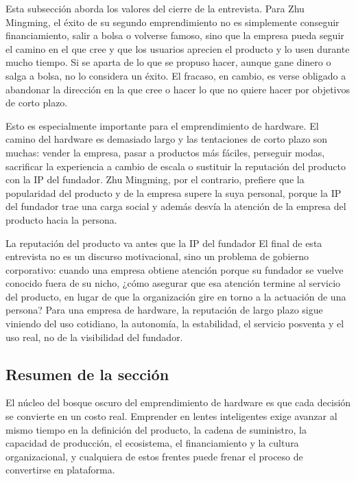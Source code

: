 \documentclass[a4paper]{article}
\begin{document}
Esta subsección aborda los valores del cierre de la entrevista. Para Zhu Mingming, el éxito de su segundo emprendimiento no es simplemente conseguir financiamiento, salir a bolsa o volverse famoso, sino que la empresa pueda seguir el camino en el que cree y que los usuarios aprecien el producto y lo usen durante mucho tiempo. Si se aparta de lo que se propuso hacer, aunque gane dinero o salga a bolsa, no lo considera un éxito. El fracaso, en cambio, es verse obligado a abandonar la dirección en la que cree o hacer lo que no quiere hacer por objetivos de corto plazo.

Esto es especialmente importante para el emprendimiento de hardware. El camino del hardware es demasiado largo y las tentaciones de corto plazo son muchas: vender la empresa, pasar a productos más fáciles, perseguir modas, sacrificar la experiencia a cambio de escala o sustituir la reputación del producto con la IP del fundador. Zhu Mingming, por el contrario, prefiere que la popularidad del producto y de la empresa supere la suya personal, porque la IP del fundador trae una carga social y además desvía la atención de la empresa del producto hacia la persona.

\begin{importantbox}{La reputación del producto va antes que la IP del fundador}
El final de esta entrevista no es un discurso motivacional, sino un problema de gobierno corporativo: cuando una empresa obtiene atención porque su fundador se vuelve conocido fuera de su nicho, ¿cómo asegurar que esa atención termine al servicio del producto, en lugar de que la organización gire en torno a la actuación de una persona? Para una empresa de hardware, la reputación de largo plazo sigue viniendo del uso cotidiano, la autonomía, la estabilidad, el servicio posventa y el uso real, no de la visibilidad del fundador.
\end{importantbox}

\subsection{Resumen de la sección}

El núcleo del bosque oscuro del emprendimiento de hardware es que cada decisión se convierte en un costo real. Emprender en lentes inteligentes exige avanzar al mismo tiempo en la definición del producto, la cadena de suministro, la capacidad de producción, el ecosistema, el financiamiento y la cultura organizacional, y cualquiera de estos frentes puede frenar el proceso de convertirse en plataforma.
\end{document}
